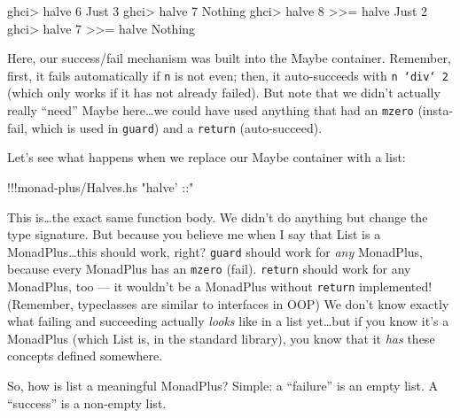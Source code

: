 \documentclass[]{article}
\newenvironment{Shaded}{}{}
\newcommand{\DataTypeTok}[1]{\textcolor[rgb]{0.56,0.13,0.00}{{#1}}}
\newcommand{\DecValTok}[1]{\textcolor[rgb]{0.25,0.63,0.44}{{#1}}}
\newcommand{\StringTok}[1]{\textcolor[rgb]{0.25,0.44,0.63}{{#1}}}
\newcommand{\FunctionTok}[1]{\textcolor[rgb]{0.02,0.16,0.49}{{#1}}}
\newcommand{\NormalTok}[1]{{#1}}
\begin{document}
\begin{Shaded}
\begin{Highlighting}[]
\NormalTok{ghci}\FunctionTok{>} \NormalTok{halve }\DecValTok{6}
\DataTypeTok{Just} \DecValTok{3}
\NormalTok{ghci}\FunctionTok{>} \NormalTok{halve }\DecValTok{7}
\DataTypeTok{Nothing}
\NormalTok{ghci}\FunctionTok{>} \NormalTok{halve }\DecValTok{8} \FunctionTok{>>=} \NormalTok{halve}
\DataTypeTok{Just} \DecValTok{2}
\NormalTok{ghci}\FunctionTok{>} \NormalTok{halve }\DecValTok{7} \FunctionTok{>>=} \NormalTok{halve}
\DataTypeTok{Nothing}
\end{Highlighting}
\end{Shaded}

Here, our success/fail mechanism was built into the Maybe container.
Remember, first, it fails automatically if \texttt{n} is not even; then,
it auto-succeeds with \texttt{n\ `div`\ 2} (which only works if it has
not already failed). But note that we didn't actually really ``need''
Maybe here\ldots{}we could have used anything that had an \texttt{mzero}
(insta-fail, which is used in \texttt{guard}) and a \texttt{return}
(auto-succeed).

Let's see what happens when we replace our Maybe container with a list:

\begin{Shaded}
\begin{Highlighting}[]
\FunctionTok{!!!}\NormalTok{monad}\FunctionTok{-}\NormalTok{plus}\FunctionTok{/}\NormalTok{Halves.hs }\StringTok{"halve' ::"}
\end{Highlighting}
\end{Shaded}

This is\ldots{}the exact same function body. We didn't do anything but
change the type signature. But because you believe me when I say that
List is a MonadPlus\ldots{}this should work, right? \texttt{guard}
should work for \emph{any} MonadPlus, because every MonadPlus has an
\texttt{mzero} (fail). \texttt{return} should work for any MonadPlus,
too --- it wouldn't be a MonadPlus without \texttt{return} implemented!
(Remember, typeclasses are similar to interfaces in OOP) We don't know
exactly what failing and succeeding actually \emph{looks} like in a list
yet\ldots{}but if you know it's a MonadPlus (which List is, in the
standard library), you know that it \emph{has} these concepts defined
somewhere.

So, how is list a meaningful MonadPlus? Simple: a ``failure'' is an
empty list. A ``success'' is a non-empty list.
\end{document}
